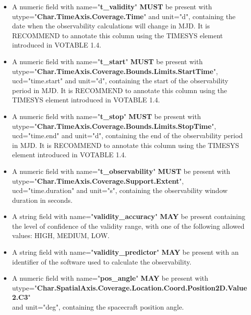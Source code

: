 \documentclass[11pt,a4paper]{ivoatex/ivoa}
\begin{document}
\begin{itemize}
\item {A numeric field with name="\textbf{t\_validity}" \textbf{MUST} be present  
with utype="\textbf{Char.TimeAxis.Coverage.Time}" and unit="d", containing the date when the 
observability calculations will change in MJD. It is RECOMMEND to annotate this column using the 
TIMESYS element introduced in VOTABLE 1.4.}

\item {A numeric field with name="\textbf{t\_start}" \textbf{MUST} be present with\\
utype="\textbf{Char.TimeAxis.Coverage.Bounds.Limits.StartTime}",\\
ucd="time.start" and unit="d", containing the start of the observability period in MJD. 
It is RECOMMEND to annotate this column using the TIMESYS element introduced in VOTABLE 1.4.}

\item {A numeric field with name="\textbf{t\_stop}" \textbf{MUST} be present with\\
utype="\textbf{Char.TimeAxis.Coverage.Bounds.Limits.StopTime}",\\
ucd="time.end" and unit="d", containing the end of the observability period in MJD.
It is RECOMMEND to annotate this column using the TIMESYS element introduced in VOTABLE 1.4.}

\item {A numeric field with name="\textbf{t\_observability}" \textbf{MUST} be present with
utype="\textbf{Char.TimeAxis.Coverage.Support.Extent}",\\
 ucd="time.duration" and unit="s", containing the observability window duration in seconds.}

\item {A string field with name="\textbf{validity\_accuracy}" \textbf{MAY} be present 
containing the level of confidence of the validity range, with one of the following allowed
values: HIGH, MEDIUM, LOW.}

\item {A string field with name="\textbf{validity\_predictor}" \textbf{MAY} be present with 
an identifier of the software used to calculate the observability.}

\item {A numeric field with name="\textbf{pos\_angle}" \textbf{MAY } be present with
utype="\textbf{Char.SpatialAxis.Coverage.Location.Coord.Position2D.Value2.C3}"\\
and unit="deg", containing the spacecraft position angle.}


\end{itemize}
\end{document}
